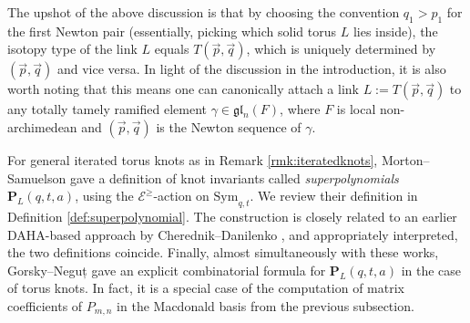 \documentclass{amsart}
\numberwithin{equation}{section}
\theoremstyle{definition}
\def\Sym{{\mathrm{Sym}}}
\newcommand{\cE}{\mathcal{E}}
\newcommand{\fl}{\mathfrak{l}}
\newcommand{\fg}{\mathfrak{g}}
\begin{document}
The upshot of the above discussion is that by choosing the convention $q_1>p_1$ for the first Newton pair (essentially, picking which solid torus $L$ lies inside), the isotopy type of the link $L$ equals $T(\vec{p},\vec{q})$, which is uniquely determined by $(\vec{p}, \vec{q})$ and vice versa. In light of the discussion in the introduction, it is also worth noting that this means one can canonically attach a link $L:=T(\vec{p},\vec{q})$ to any totally tamely ramified element $\gamma\in \fg\fl_n(F)$, where $F$ is local non-archimedean and $(\vec{p},\vec{q})$ is the Newton sequence of $\gamma$. 



For general iterated torus knots as in Remark \ref{rmk:iteratedknots}, Morton--Samuelson \cite{MS} gave a definition of knot invariants called {\em superpolynomials} $\mathbf{P}_L(q,t,a)$, using the $\cE^\geq$-action on $\Sym_{q,t}$. We review their definition in Definition \ref{def:superpolynomial}. The construction is closely related to an earlier DAHA-based approach by Cherednik--Danilenko \cite{CD}, and appropriately interpreted, the two definitions coincide. Finally, almost simultaneously with these works, Gorsky--Neguț \cite{GN} gave an explicit combinatorial formula for $\mathbf{P}_L(q,t,a)$ in the case of torus knots. In fact, it is a special case of  the computation of matrix coefficients of $P_{m,n}$ in the Macdonald basis from the previous subsection. 
\end{document}
